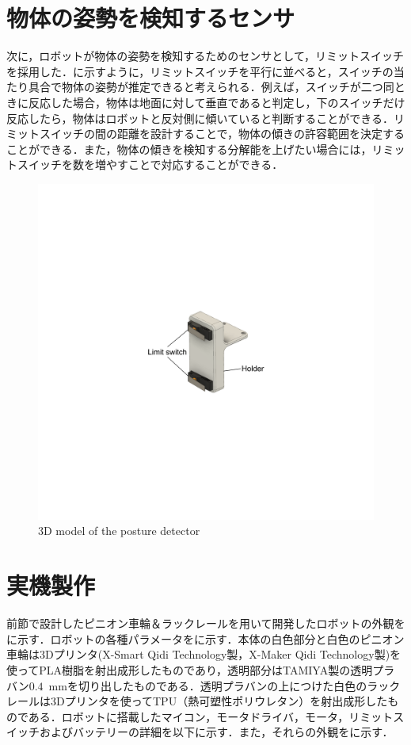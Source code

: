 \section{物体の姿勢を検知するセンサ}
次に，ロボットが物体の姿勢を検知するためのセンサとして，リミットスイッチを採用した．に示すように，リミットスイッチを平行に並べると，スイッチの当たり具合で物体の姿勢が推定できると考えられる．例えば，スイッチが二つ同ときに反応した場合，物体は地面に対して垂直であると判定し，下のスイッチだけ反応したら，物体はロボットと反対側に傾いていると判断することができる．リミットスイッチの間の距離を設計することで，物体の傾きの許容範囲を決定することができる．また，物体の傾きを検知する分解能を上げたい場合には，リミットスイッチを数を増やすことで対応することができる．

\begin{figure}[tb]
  \centering
  \includegraphics[width=.5\columnwidth]{figure/posture-detector-v2.pdf}
  \caption{3D model of the posture detector}
  \label{fig:limit-switch-edited}
\end{figure}

\section{実機製作}
前節で設計したピニオン車輪＆ラックレールを用いて開発したロボットの外観をに示す．ロボットの各種パラメータをに示す．本体の白色部分と白色のピニオン車輪は3Dプリンタ(X-Smart Qidi Technology製，X-Maker Qidi Technology製)を使ってPLA樹脂を射出成形したものであり，透明部分はTAMIYA製の透明プラバン$0.4$~mmを切り出したものである．透明プラバンの上につけた白色のラックレールは3Dプリンタを使ってTPU（熱可塑性ポリウレタン）を射出成形したものである．ロボットに搭載したマイコン，モータドライバ，モータ，リミットスイッチおよびバッテリーの詳細を以下に示す．また，それらの外観をに示す．

